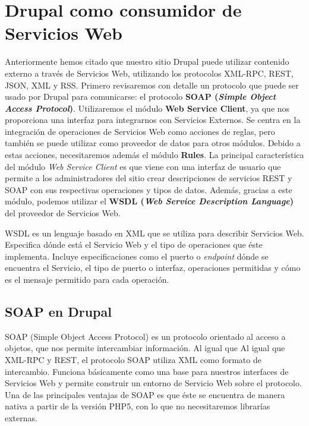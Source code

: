 \chapter{\Large{Drupal como consumidor de Servicios Web}}
\newline 

Anteriormente hemos citado que nuestro sitio Drupal puede utilizar contenido externo a través de Servicios 
Web, utilizando los protocolos XML-RPC, REST, JSON, XML y RSS. Primero revisaremos con detalle un protocolo 
que puede ser usado por Drupal para comunicarse: el protocolo \textbf{SOAP (\textit{Simple Object Access Protocol})}.
Utilizaremos el módulo \textbf{Web Service Client}, ya que nos proporciona una interfaz para integrarnos 
con Servicios Externos. Se centra en la integración de operaciones de Servicios Web como acciones de reglas, 
pero también se puede utilizar como proveedor de datos para otros módulos. Debido a estas acciones, necesitaremos 
además el módulo \textbf{Rules}. La principal característica del módulo \textit{Web Service Client} es que 
viene con una interfaz de usuario que permite a los administradores del sitio crear descripciones de 
servicios REST y SOAP con sus respectivas operaciones y tipos de datos. Además, gracias a este módulo, 
podemos utilizar el \textbf{WSDL (\textit{Web Service Description Language})} del proveedor de Servicios Web.

WSDL es un lenguaje basado en XML que se utiliza para describir Servicios Web. Especifica dónde está el 
Servicio Web y el tipo de operaciones que éste implementa. Incluye especificaciones como el puerto 
o \textit{endpoint} dónde se encuentra el Servicio, el tipo de puerto o interfaz, operaciones permitidas y 
cómo es el mensaje permitido para cada operación. 

\section{SOAP en Drupal}

SOAP (Simple Object Access Protocol) es un protocolo orientado al acceso a objetos, que nos permite intercambiar 
información. Al igual que Al igual que XML-RPC y REST, el protocolo SOAP utiliza XML como formato de 
intercambio. Funciona básicamente como una base para nuestros interfaces de Servicios Web y permite construir 
un entorno de Servicio Web sobre el protocolo. Una de las principales ventajas de SOAP es que éste se encuentra 
de manera nativa a partir de la versión PHP5, con lo que no necesitaremos librarías externas.

